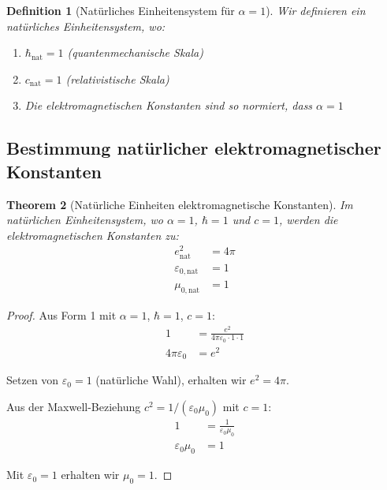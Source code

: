 \documentclass[12pt,a4paper]{article}
\newcommand{\alphaem}{\alpha}
\newtheorem{theorem}{Theorem}[section]
\newtheorem{definition}[theorem]{Definition}
\begin{document}
	\begin{definition}[Natürliches Einheitensystem für $\alpha = 1$]
		Wir definieren ein natürliches Einheitensystem, wo:
		\begin{enumerate}
			\item $\hbar_{\text{nat}} = 1$ (quantenmechanische Skala)
			\item $c_{\text{nat}} = 1$ (relativistische Skala)  
			\item Die elektromagnetischen Konstanten sind so normiert, dass $\alphaem = 1$
		\end{enumerate}
	\end{definition}
	
	\subsection{Bestimmung natürlicher elektromagnetischer Konstanten}
	
	\begin{theorem}[Natürliche Einheiten elektromagnetische Konstanten]
		Im natürlichen Einheitensystem, wo $\alpha = 1$, $\hbar = 1$ und $c = 1$, werden die elektromagnetischen Konstanten zu:
		\begin{align}
			e_{\text{nat}}^2 &= 4\pi \label{eq:e_nat}\\
			\varepsilon_{0,\text{nat}} &= 1 \label{eq:eps_nat}\\
			\mu_{0,\text{nat}} &= 1 \label{eq:mu_nat}
		\end{align}
	\end{theorem}
	
	\begin{proof}
		Aus Form 1 mit $\alphaem = 1$, $\hbar = 1$, $c = 1$:
		\begin{align}
			1 &= \frac{e^2}{4\pi\varepsilon_0 \cdot 1 \cdot 1}\\
			4\pi\varepsilon_0 &= e^2
		\end{align}
		
		Setzen von $\varepsilon_0 = 1$ (natürliche Wahl), erhalten wir $e^2 = 4\pi$.
		
		Aus der Maxwell-Beziehung $c^2 = 1/(\varepsilon_0\mu_0)$ mit $c = 1$:
		\begin{align}
			1 &= \frac{1}{\varepsilon_0\mu_0}\\
			\varepsilon_0\mu_0 &= 1
		\end{align}
		
		Mit $\varepsilon_0 = 1$ erhalten wir $\mu_0 = 1$.
	\end{proof}
	
\end{document}
